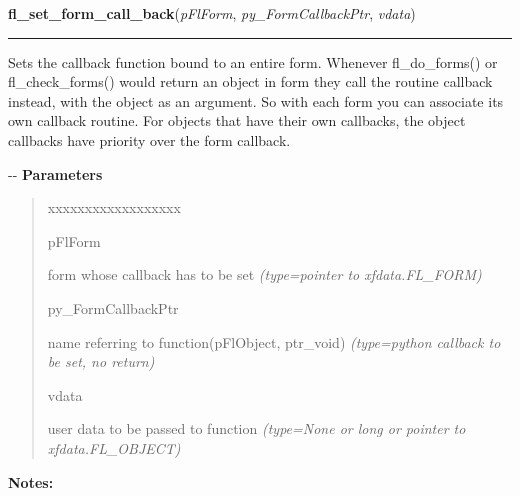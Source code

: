     \label{xformslib:flbasic:fl_set_form_callback}

    \vspace{0.5ex}

\hspace{.8\funcindent}\begin{boxedminipage}{\funcwidth}

    \raggedright \textbf{fl\_set\_form\_call\_back}(\textit{pFlForm}, \textit{py\_FormCallbackPtr}, \textit{vdata})

    \vspace{-1.5ex}

    \rule{\textwidth}{0.5\fboxrule}
\setlength{\parskip}{2ex}

Sets the callback function bound to an entire form. Whenever
fl\_do\_forms() or fl\_check\_forms() would return an object in form they
call the routine callback instead, with the object as an argument. So
with each form you can associate its own callback routine. For objects
that have their own callbacks, the object callbacks have priority over
the form callback.

-{}-
\setlength{\parskip}{1ex}
      \textbf{Parameters}
      \vspace{-1ex}

      \begin{quote}
        \begin{Ventry}{xxxxxxxxxxxxxxxxxx}

          \item[pFlForm]


form whose callback has to be set
            {\it (type=pointer to xfdata.FL\_FORM)}

          \item[py\_FormCallbackPtr]


name referring to function(pFlObject, ptr\_void)
            {\it (type=python callback to be set, no return)}

          \item[vdata]


user data to be passed to function
            {\it (type=None or long or pointer to xfdata.FL\_OBJECT)}

        \end{Ventry}

      \end{quote}

\textbf{Notes:}
\begin{quote}
  \begin{itemize}


\end{itemize}
\end{quote}
\end{boxedminipage}
